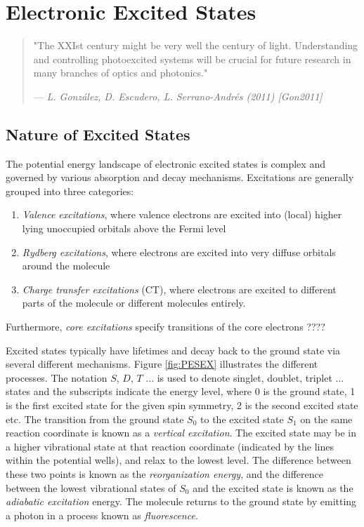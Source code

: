 \chapter{Electronic Excited States}

\begin{quote}
  "The XXIst century might be very well the century of light. Understanding and controlling photoexcited systems will be crucial for future research in many branches of optics and photonics."
  \begin{flushright}
    \small{--- \textit{L. González, D. Escudero, L. Serrano-Andrés (2011) [Gon2011] }}
  \end{flushright}
\end{quote}



\section{Nature of Excited States}

The potential energy landscape of electronic excited states is complex and governed by various absorption and decay mechanisms. Excitations are generally grouped into three categories:
\begin{enumerate}
\item \emph{Valence excitations}, where valence electrons are excited into (local) higher lying unoccupied orbitals above the Fermi level
\item \emph{Rydberg excitations}, where electrons are excited into very diffuse orbitals around the molecule
\item \emph{Charge transfer excitations} (CT), where electrons are excited to different parts of the molecule or different molecules entirely. 
\end{enumerate}
\noindent Furthermore, \emph{core excitations} specify transitions of the core electrons ????

Excited states typically have lifetimes and decay back to the ground state via several different mechanisms. Figure \ref{fig:PESEX} illustrates the different processes. The notation $S$, $D$, $T$ ... is used to denote singlet, doublet, triplet ... states and the subscripts indicate the energy level, where 0 is the ground state, 1 is the first excited state for the given spin symmetry, 2 is the second excited state etc. The transition from the ground state $S_0$ to the excited state $S_1$ on the same reaction coordinate is known as a \emph{vertical excitation}. The excited state may be in a higher vibrational state at that reaction coordinate (indicated by the lines within the potential wells), and relax to the lowest level. The difference between these two points is known as the \emph{reorganization energy}, and the difference between the lowest vibrational states of $S_0$ and the excited state is known as the \emph{adiabatic excitation} energy. The 
molecule returns to the ground state by emitting a photon in a process known as \emph{fluorescence}. 

